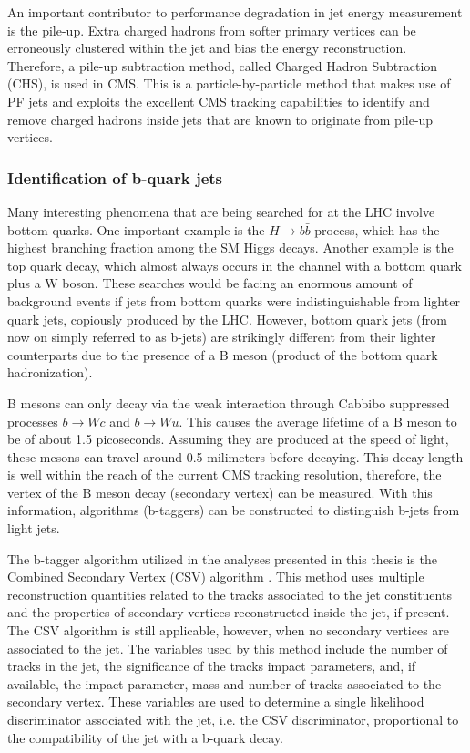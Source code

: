An important contributor to performance degradation in jet energy measurement is the pile-up. 
Extra charged hadrons from softer primary vertices can be erroneously clustered within the jet and bias the energy reconstruction. 
Therefore, a pile-up subtraction method, called Charged Hadron Subtraction (CHS), is used in CMS. 
This is a particle-by-particle method that makes use of PF jets and exploits the excellent CMS tracking capabilities to identify and remove charged hadrons inside jets that are known to originate from pile-up vertices.

\subsubsection{Identification of b-quark jets}

Many interesting phenomena that are being searched for at the LHC involve bottom quarks. 
One important example is the $H\rightarrow b\bar{b}$ process, which has the highest branching fraction among the SM Higgs decays. 
Another example is the top quark decay, which almost always occurs in the channel with a bottom quark plus a W boson. 
These searches would be facing an enormous amount of background events if jets from bottom quarks were indistinguishable from lighter quark jets, copiously produced by the LHC. 
However, bottom quark jets (from now on simply referred to as b-jets) are strikingly different from their lighter counterparts due to the presence of a B meson (product of the bottom quark hadronization). 

B mesons can only decay via the weak interaction through Cabbibo suppressed processes $b\rightarrow Wc$ and $b\rightarrow Wu$. 
This causes the average lifetime of a B meson to be of about 1.5 picoseconds. 
Assuming they are produced at the speed of light, these mesons can travel around 0.5 milimeters before decaying. 
This decay length is well within the reach of the current CMS tracking resolution, therefore, the vertex of the B meson decay (secondary vertex) can be measured. 
With this information, algorithms (b-taggers) can be constructed to distinguish b-jets from light jets.

The b-tagger algorithm utilized in the analyses presented in this thesis is the Combined Secondary Vertex (CSV) algorithm \cite{cms_btag}. 
This method uses multiple reconstruction quantities related to the tracks associated to the jet constituents and the properties of secondary vertices reconstructed inside the jet, if present. 
The CSV algorithm is still applicable, however, when no secondary vertices are associated to the jet. 
The variables used by this method include the number of tracks in the jet, the significance of the tracks impact parameters, and, if available, the impact parameter, mass and number of tracks associated to the secondary vertex. 
These variables are used to determine a single likelihood discriminator associated with the jet, i.e. the CSV discriminator, proportional to the compatibility of the jet with a b-quark decay.













